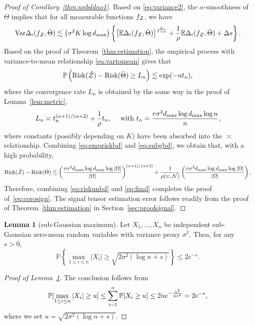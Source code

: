 \documentclass[twoside,11pt]{article}
\theoremstyle{definition}
\newtheorem{lem}{Lemma}
\begin{document}
\begin{proof}[Proof of Corollary~\ref{thm:unbddno1}]
Based on \eqref{eq:variance2}, the $\alpha$-smoothness of $\Theta$ implies that for all measurable functions $f_{\mathcal{Z}}$, we have
\begin{align}\label{eq:vartomean}
\text{Var}\Delta_i(f_{\mathcal{Z}},\bar \Theta)\lesssim \left(\sigma^2K\log d_{\max}\right) \left\{\left[\mathbb{E}\Delta_i(f_{\mathcal{Z}},\bar \Theta)\right]^{\alpha\over1+\alpha}+\frac{1}{\rho}\mathbb{E}\Delta_i(f_{\mathcal{Z}},\bar \Theta)+\Delta s\right\}.
\end{align}
Based on the proof of Theorem~\ref{thm:estimation}, the empirical process with variance-to-mean relationship  \eqref{eq:vartomean} gives that
\begin{align}\label{eq:empriskbd}
\mathbb{P	}\left(\text{Risk}(\hat{\mathcal{Z}})-\text{Risk}(\bar\Theta)\geq L_n\right)\lesssim \exp(-nt_n),
\end{align}
where the convergence rate $L_n$ is obtained by the same way in the proof of Lemma~\ref{lem:metric}, 
\begin{align}\label{eq:subgbd}
L_n\asymp t_n^{(\alpha+1)/(\alpha+2)}+\frac{1}{\rho}t_n,\quad\text{ with } t_n =  {r \sigma^2 d_{\max}\log d_{\max}\log n  \over n},
\end{align}
where constants (possibly depending on $K$) have been absorbed into the $\asymp$ relationship.
Combining \eqref{eq:empriskbd} and \eqref{eq:subgbd}, we obtain that, with a high probability,
\begin{align}\label{eq:riskunbd}
   \text{Risk}(\hat{\mathcal{Z}})-\text{Risk}(\bar\Theta)\lesssim \left( {r \sigma^2  d_{\max}\log d_{\max}\log|\Omega|  \over |\Omega|}\right)^{(\alpha+1)/(\alpha+2)}+\frac{1}{\rho(\pi,\mathcal{N})} \left({r \sigma^2  d_{\max} \log d_{\max}\log|\Omega| \over |\Omega|} \right),
\end{align} 
 Therefore, combining \eqref{eq:riskunbd} and \eqref{eq:final} completes the proof of~\eqref{eq:corosign}. The signal tensor estimation error follows readily from the proof of Theorem~\ref{thm:estimation} in Section~\ref{sec:proofsignal}.
 \end{proof}




\begin{lem}[sub-Gaussian maximum]\label{lem:subg}
Let $X_1,\ldots,X_n$ be independent sub-Gaussian zero-mean random variables with variance proxy $\sigma^2$. Then, for any $s>0,$
\[\mathbb{P}\left\{\max_{1\leq i\leq n}|X_i|\geq\sqrt{2\sigma^2(\log n +s)}\right\}\leq2 e^{-s}.\]
\end{lem}
\begin{proof}[Proof of Lemma~\ref{lem:subg}]
The conclusion follows from
\begin{align}
\mathbb{P}[\max_{1\leq i\leq n}|X_i|\geq u] \leq \sum_{i=1}^n\mathbb{P}[X_i\geq u]\leq 2n e^{-{u^2\over 2\sigma^2}} = 2e^{-s},
\end{align}
where we set $u = \sqrt{2\sigma^2(\log n+s)}.$
\end{proof}
\end{document}
